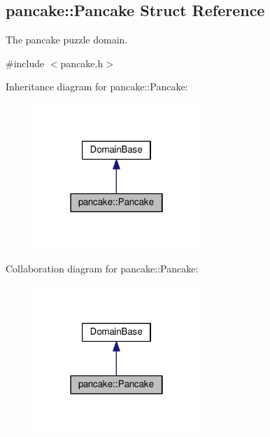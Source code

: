 \hypertarget{structpancake_1_1Pancake}{}\subsection{pancake\+:\+:Pancake Struct Reference}
\label{structpancake_1_1Pancake}


The pancake puzzle domain.  




{\ttfamily \#include $<$pancake.\+h$>$}



Inheritance diagram for pancake\+:\+:Pancake\+:\nopagebreak
\begin{figure}[H]
\begin{center}
\leavevmode
\includegraphics[width=178pt]{structpancake_1_1Pancake__inherit__graph}
\end{center}
\end{figure}


Collaboration diagram for pancake\+:\+:Pancake\+:\nopagebreak
\begin{figure}[H]
\begin{center}
\leavevmode
\includegraphics[width=178pt]{structpancake_1_1Pancake__coll__graph}
\end{center}
\end{figure}
